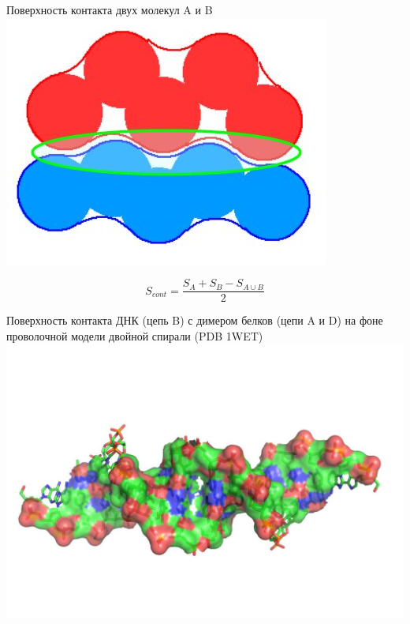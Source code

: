 \documentclass{beamer}
\begin{document}
    \begin{frame}{Поверхность контакта двух молекул A и B}
        \includegraphics[height=0.4\textheight]{contact.jpg}

        $$ S_{cont} = \frac{S_A + S_B - S_{A \cup B}}{2} $$
    \end{frame}

    \begin{frame}{Поверхность контакта ДНК (цепь B)
        с димером белков (цепи A и D)
        на фоне проволочной модели двойной спирали (PDB 1WET)}
        \includegraphics[height=0.8\textheight]{contact-dna.jpg}
    \end{frame}
\end{document}
